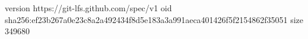 version https://git-lfs.github.com/spec/v1
oid sha256:ef23b267a0e23c8a2a492434f8d5e183a3a991aeca401426f5f2154862f35051
size 349680

